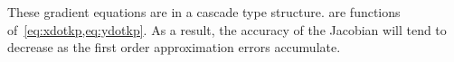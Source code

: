 \documentclass[smallcondensed]{svjour3}
\begin{document}
These gradient equations are in a cascade type structure.
 are functions of~\cref{eq:xdotkp,eq:ydotkp}.
As a result, the accuracy of the Jacobian will tend to decrease as the first order approximation errors accumulate.




\end{document}
